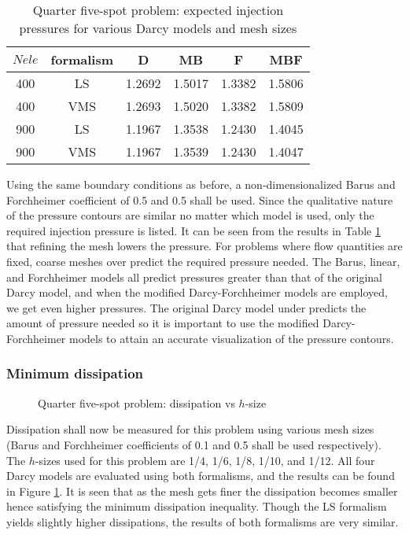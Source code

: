 \documentclass[11pt,reqno]{amsart}
\begin{document}
\begin{table}[h!]
  \centering
  \caption{Quarter five-spot problem: expected injection pressures for various Darcy 
  models and mesh sizes}
  \begin{tabular}{cc|cccc}
      \hline
      $Nele$ & formalism & D & MB & F & MBF \\
      \hline
      400 & LS & 1.2692 & 1.5017 & 1.3382 & 1.5806 \\
      400 & VMS & 1.2693 & 1.5020 & 1.3382 & 1.5809 \\
      900 & LS & 1.1967 & 1.3538 & 1.2430 & 1.4045 \\
      900 & VMS & 1.1967 & 1.3539 & 1.2430 & 1.4047 \\
      \hline
  \end{tabular}
  \label{Tab:quarter_spot_pvm}
\end{table}
Using the same boundary conditions as before, a non-dimensionalized Barus and 
Forchheimer coefficient of 0.5 and 0.5 shall be used. Since the qualitative nature of 
the pressure contours are similar no matter which model is used, only the required 
injection pressure is listed. It can be seen from the results in Table 
\ref{Tab:quarter_spot_pvm} that refining the mesh lowers the pressure. For problems where 
flow quantities are fixed, coarse meshes over predict the required pressure needed. 
The Barus, linear, and Forchheimer models all predict pressures greater than that of the 
original Darcy model, and when the modified Darcy-Forchheimer models are employed, 
we get even higher pressures. The original Darcy model under predicts the amount of 
pressure needed so it is important to use the modified Darcy-Forchheimer models to 
attain an accurate visualization of the pressure contours.

\subsubsection{Minimum dissipation}
\begin{figure}[t!]
  \centering
  \caption{Quarter five-spot problem: dissipation vs $h$-size}
  \label{Fig:quarter_spot_dissipation}
\end{figure}
Dissipation shall now be measured for this problem using various mesh sizes (Barus and
Forchheimer coefficients of 0.1 and 0.5 shall be used respectively). The 
$h$-sizes used for this problem are 1/4, 1/6, 1/8, 1/10, and 1/12. All four Darcy models are
evaluated using both formalisms, and the results can be found in Figure 
\ref{Fig:quarter_spot_dissipation}. It is seen that as the mesh gets finer the dissipation
becomes smaller hence satisfying the minimum dissipation inequality. Though the LS
formalism yields slightly higher dissipations, the results
of both formalisms are very similar.
\end{document}
